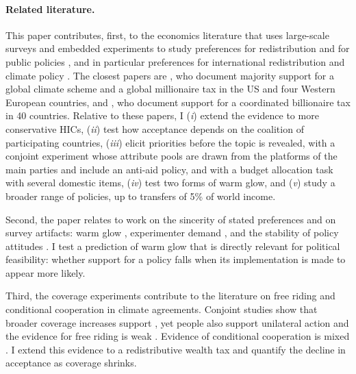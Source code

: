 \documentclass[12pt,english]{article}
\begin{document}
\paragraph{Related literature.} This paper contributes, first, to the economics literature that uses large-scale surveys and embedded experiments to study preferences for redistribution and for public policies \citep{kuziemko_how_2015,alesina_intergenerational_2018,stantcheva_how_2023}, and in particular preferences for international redistribution and climate policy \citep{nair_misperceptions_2018,fehr_your_2022,kaufmann_foreign_2019,douenne_yellow_2022,dechezlepretre_fighting_2025}. The closest papers are \cite{fabre_majority_2025}, who document majority support for a global climate scheme and a global millionaire tax in the US and four Western European countries, and \cite{cappelen_majority_2025}, who document support for a coordinated billionaire tax in 40 countries. Relative to these papers, I (\textit{i}) extend the evidence to more conservative HICs, (\textit{ii}) test how acceptance depends on the coalition of participating countries, (\textit{iii}) elicit priorities before the topic is revealed, with a conjoint experiment whose attribute pools are drawn from the platforms of the main parties and include an anti-aid policy, and with a budget allocation task with several domestic items, (\textit{iv}) test two forms of warm glow, and (\textit{v}) study a broader range of policies, up to transfers of 5\% of world income.

Second, the paper relates to work on the sincerity of stated preferences and on survey artifacts: warm glow \citep{andreoni_impure_1990,nunes_identifying_2003}, experimenter demand \citep{de_quidt_measuring_2018,mummolo_demand_2019}, and the stability of policy attitudes \citep{ansolabehere_strength_2008}. I test a prediction of warm glow that is directly relevant for political feasibility: whether support for a policy falls when its implementation is made to appear more likely.

Third, the coverage experiments contribute to the literature on free riding and conditional cooperation in climate agreements. Conjoint studies show that broader coverage increases support \citep{beiser-mcgrath_could_2019,gampfer_obtaining_2014}, yet people also support unilateral action \citep{bernauer_how_2015,mcgrath_how_2017,beiser-mcgrath_commitment_2019} and the evidence for free riding is weak \citep{aklin_prisoners_2020}. Evidence of conditional cooperation is mixed \citep{carlsson_importance_2025,tam_they_2025}. I extend this evidence to a redistributive wealth tax and quantify the decline in acceptance as coverage shrinks.
\end{document}
